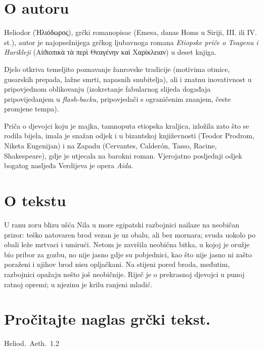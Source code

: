 \section*{O autoru}

Heliodor \textgreek[variant=ancient]{(Ἡλιόδωρος),} grčki romanopisac (Emesa, danas Homs u Siriji, III. ili IV. st.), autor je najopsežnijega grčkog ljubavnoga romana \textit{Etiopske priče o Teagenu i Harikleji} \textgreek[variant=ancient]{(Αἰϑιοπικὰ τὰ περὶ Θεαγένην καὶ Χαρίκλειαν)} u deset knjiga. 

Djelo otkriva temeljito poznavanje žanrovske tradicije (motivima otmice, gusarskih prepada, lažne smrti, napasnih snubitelja), ali i znatnu inovativnost u pripovjednom oblikovanju (izokretanje fabularnog slijeda događaja pripovijedanjem u \textit{flash-backu}, pripovjedači s ograničenim znanjem, česte promjene tempa). 

Priča o djevojci koju je majka, tamnoputa etiopska kraljica, izložila zato što se rodila bijela, imala je snažan odjek i u bizantskoj književnosti (Teodor Prodrom, Niketa Eugenijan) i na Zapadu (Cervantes, Calderón, Tasso, Racine, Shakespeare), gdje je utjecala na barokni roman. Vjerojatno posljednji odjek bogatog nasljeđa Verdijeva je opera \textit{Aida}.

\section*{O tekstu}

U ranu zoru blizu ušća Nila u more egipatski razbojnici nailaze na neobičan prizor: teško natovaren brod vezan je uz obalu, ali bez mornara; svuda uokolo po obali leže mrtvaci i umirući. Netom je završila neobična bitka, u kojoj je oružje bio pribor za gozbu, no nije jasno gdje su pobjednici, kao što nije jasno ni zašto poraženi i njihov brod nisu opljačkani. Na stijeni pored broda, međutim, razbojnici opažaju nešto još neobičnije. Riječ je o prekrasnoj djevojci u punoj ratnoj opremi; u njezinu je krilu ranjeni mladić.


\section*{Pročitajte naglas grčki tekst.}

Heliod.\ Aeth.\ 1.2


\medskip

